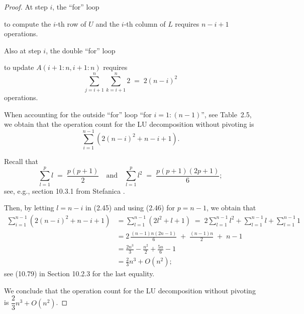 \begin{proof}
At step $i$, the ``for'' loop

\begin{center}
\end{center}

\noindent to compute the $i$-th row of $U$ and the $i$-th column of $L$
requires $n-i+1$ operations.

Also at step $i$, the double ``for'' loop

\begin{center}
\end{center}

\noindent to update $A(i+1:n,i+1:n)$ requires
\[
\sum_{j=i+1}^{n}\sum_{k=i+1}^{n} 2 \;=\; 2(n-i)^2
\]
operations.

When accounting for the outside ``for'' loop ``for $i=1:(n-1)$'', see
Table~2.5, we obtain that the operation count for the LU decomposition
without pivoting is
\begin{equation}
\sum_{i=1}^{n-1} \left(2(n-i)^2+n-i+1\right).
\end{equation}

Recall that
\begin{equation}
\sum_{l=1}^{p} l \;=\; \frac{p(p+1)}{2} \quad \text{and} \quad \sum_{l=1}^{p} l^2 \;=\; \frac{p(p+1)(2p+1)}{6};
\end{equation}
see, e.g., section 10.3.1 from Stefanica \cite{36}.

Then, by letting $l=n-i$ in (2.45) and using (2.46) for $p=n-1$, we obtain
that
\begin{align*}
\sum_{i=1}^{n-1}\left(2(n-i)^2+n-i+1\right)
&= \sum_{l=1}^{n-1}\left(2l^2+l+1\right)
\;=\; 2\sum_{l=1}^{n-1}l^2 + \sum_{l=1}^{n-1}l + \sum_{l=1}^{n-1}1 \\
&= 2\,\frac{(n-1)n(2n-1)}{6} \;+\; \frac{(n-1)n}{2} \;+\; n-1 \\
&= \frac{2n^3}{3} - \frac{n^2}{2} + \frac{5n}{6} - 1 \\
&= \frac{2}{3}n^3 + O(n^2);
\end{align*}
see (10.79) in Section 10.2.3 for the last equality.

We conclude that the operation count for the LU decomposition without
pivoting is $\dfrac{2}{3}n^3+O(n^2)$.
\end{proof}
